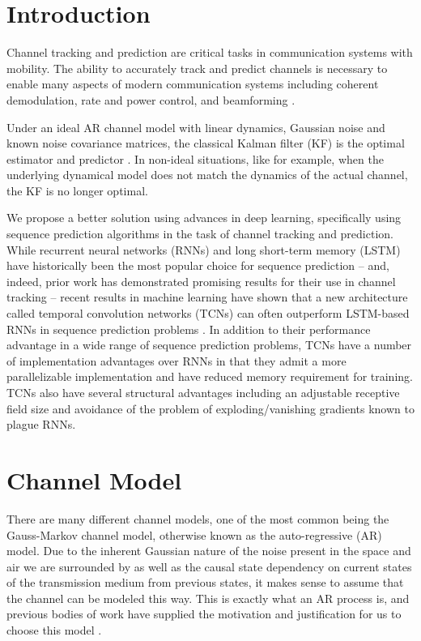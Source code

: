 \documentclass[twocolumn,letterpaper]{IEEEAerospaceCLS}  %
\begin{document}
\tableofcontents

\section{Introduction}
\label{sec:intro}

Channel tracking and prediction are critical tasks in communication systems with mobility. The ability to accurately track and predict channels is necessary to enable many aspects of modern communication systems including coherent demodulation, rate and power control, and beamforming \cite{181202986}.

Under an ideal AR channel model with linear dynamics, Gaussian noise and known noise covariance matrices, the classical Kalman filter (KF) is the optimal estimator and predictor \cite{kay1993fundamentals}.  In  non-ideal  situations,  like  for  example,  when  the underlying dynamical model does not match the dynamics of the actual channel, the KF is no longer optimal.

We propose a better solution using  advances in deep  learning, specifically using sequence prediction algorithms in the task of  channel  tracking  and  prediction. While recurrent neural networks (RNNs) and long short-term memory (LSTM) have historically been the most popular choice for sequence prediction -- and, indeed, prior work has demonstrated promising results for their use in channel tracking \cite{7508408} \cite{hochreiter1997long} -- recent results in machine learning have shown that a new architecture called temporal convolution networks (TCNs) can often outperform LSTM-based RNNs in sequence prediction problems \cite{BaiTCN2018}.  In addition to their performance advantage in a wide range of sequence prediction problems, TCNs have a number of implementation advantages over RNNs in that they admit a more parallelizable implementation and have reduced memory requirement for training. TCNs also have several structural advantages including an adjustable receptive field size and avoidance of the problem of exploding/vanishing gradients known to plague RNNs.


\section{Channel Model}
\label{sec:channelmodel}

There are many different channel models, one of the most common being the Gauss-Markov channel model, otherwise known as the auto-regressive (AR) model. Due to the inherent Gaussian nature of the noise present in the space and air we are surrounded by as well as the causal state dependency on current states of the transmission medium from previous states, it makes sense to assume that the channel can be modeled this way. This is exactly what an AR process is, and previous bodies of work have supplied the motivation and justification for us to choose this model \cite{181202986} \cite{baddour2001autoregressive}.
\end{document}
